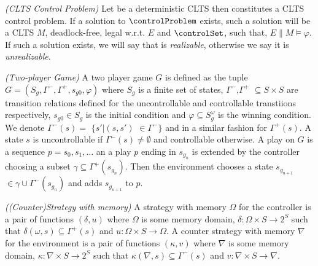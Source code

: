 \begin{definition}
	\label{def:clts_control_problem} \emph{(CLTS Control Problem)} 
	Let  be a deterministic CLTS then \controlProblemDef constitutes a CLTS control problem. If a solution to $\controlProblem$ exists, such a solution will be a CLTS $M$, deadlock-free, legal w.r.t. $E$ and $\controlSet$, such that, $E \parallel M \models \varphi$. If such a solution exists, we will say that \controlProblem is \emph{realizable}, otherwise we say it is \emph{unrealizable}.
\end{definition}


\begin{definition}\label{def:twoplayer-game}\emph{(Two-player Game)}
	A two player game $G$ is defined as the tuple $G=(S_g,\Gamma^{-},\Gamma^{+},s_{g0}, \varphi)$ where $S_{g}$ is a finite set of states, $\Gamma^{-}$,$\Gamma^{+}$ $\subseteq S\times S$ are transition relations defined for the uncontrollable and controllable transtiions respectively, $s_{g0}\in S_{g}$ is the initial condition and $\varphi \subseteq S_{g}^{\omega}$ is the winning condition.  We denote $\Gamma^{-}(s) =$ $\{s'|(s,s')$ $\in \Gamma^{-}\}$ and in a similar fashion for $\Gamma^{+}(s)$. A state $s$ is uncontrollable if $\Gamma^{-}(s)\neq \emptyset$ and controllable otherwise.  A play on $G$ is a sequence $p=s_0,s_1,\ldots$ an a play $p$ ending in $s_{g_{n}}$ is extended by the controller choosing a subset $\gamma \subseteq \Gamma^{+}(s_{g_{n}})$.  Then the environment chooses a state $s_{g_{n+1}}$ $\in \gamma \cup \Gamma^{-}(s_{g_{n}})$ and adds $s_{g_{n+1}}$ to $p$.
\end{definition}

\begin{definition}\label{def:strategy}\emph{((Counter)Strategy with memory)}
	A strategy with memory $\Omega$ for the controller is a pair of functions $(\delta, u)$ where $\Omega$ is some memory domain, $\delta:\Omega\times S \rightarrow 2^{S}$ such that $\delta(\omega, s) \subseteq \Gamma^{+}(s)$ and $u:\Omega \times S \rightarrow \Omega$.
	A counter strategy with memory $\nabla$ for the environment is a pair of functions $(\kappa, v)$ where $\nabla$ is some memory domain, $\kappa:\nabla\times S \rightarrow 2^{S}$ such that $\kappa(\nabla, s) \subseteq \Gamma^{-}(s)$ and $v:\nabla \times S \rightarrow \nabla$.
\end{definition}


